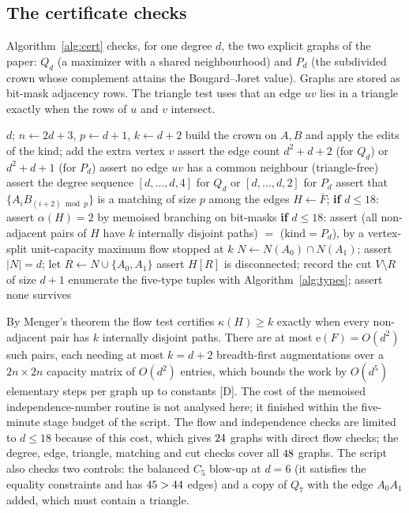 \documentclass[11pt]{article}
\theoremstyle{remark}
\newcommand{\e}{\mathrm{e}}
\begin{document}
\subsection{The certificate checks}\label{sec:cert}

Algorithm~\ref{alg:cert} checks, for one degree $d$, the two explicit graphs of the paper: $Q_d$ (a maximizer with a shared neighbourhood) and $P_d$ (the subdivided crown whose complement attains the Bougard--Joret value). Graphs are stored as bit-mask adjacency rows. The triangle test uses that an edge $uv$ lies in a triangle exactly when the rows of $u$ and $v$ intersect.

\begin{algorithm}[ht]
\caption{Certificate checks for one degree (standard library only).}\label{alg:cert}
\begin{algorithmic}[1]
\Require $d$; $n\gets2d+3$, $p\gets d+1$, $k\gets d+2$
  \State build the crown on $A,B$ and apply the edits of the kind; add the extra vertex $v$
  \State assert the edge count $d^2+d+2$ (for $Q_d$) or $d^2+d+1$ (for $P_d$)
  \State assert no edge $uv$ has a common neighbour (triangle-free)
  \State assert the degree sequence $[d,\ldots,d,4]$ for $Q_d$ or $[d,\ldots,d,2]$ for $P_d$
  \State assert that $\{A_iB_{(i+2)\bmod p}\}$ is a matching of size $p$ among the edges
  \State $H\gets\overline{F}$; \textbf{if} $d\le18$: assert $\alpha(H)=2$ by memoised branching on bit-masks
  \State \textbf{if} $d\le18$: assert (all non-adjacent pairs of $H$ have $k$ internally disjoint paths) $=$ ($\mathrm{kind}=P_d$), by a vertex-split unit-capacity maximum flow stopped at $k$
     \State $N\gets N(A_0)\cap N(A_1)$; assert $|N|=d$; let $R\gets N\cup\{A_0,A_1\}$
     \State assert $H[R]$ is disconnected; record the cut $V\setminus R$ of size $d+1$
  \EndIf
\EndFor
\State enumerate the five-type tuples with Algorithm~\ref{alg:types}; assert none survives
\end{algorithmic}
\end{algorithm}

By Menger's theorem the flow test certifies $\kappa(H)\ge k$ exactly when every non-adjacent pair has $k$ internally disjoint paths. There are at most $\e(F)=O(d^2)$ such pairs, each needing at most $k=d+2$ breadth-first augmentations over a $2n\times2n$ capacity matrix of $O(d^2)$ entries, which bounds the work by $O(d^5)$ elementary steps per graph up to constants [D]. The cost of the memoised independence-number routine is not analysed here; it finished within the five-minute stage budget of the script. The flow and independence checks are limited to $d\le18$ because of this cost, which gives $24$ graphs with direct flow checks; the degree, edge, triangle, matching and cut checks cover all $48$ graphs. The script also checks two controls: the balanced $C_5$ blow-up at $d=6$ (it satisfies the equality constraints and has $45>44$ edges) and a copy of $Q_7$ with the edge $A_0A_1$ added, which must contain a triangle.
\end{document}
